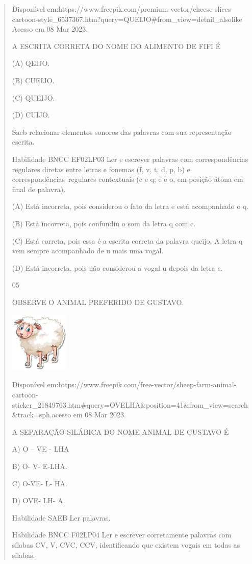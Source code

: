 {{{{\begin{verse}
{{\begin{escolha}
{{{{{Disponível
em:https://www.freepik.com/premium-vector/cheese-slices-cartoon-style\_6537367.htm?query=QUEIJO\#from\_view=detail\_alsolike
Acesso em 08 Mar 2023.

A ESCRITA CORRETA DO NOME DO ALIMENTO DE FIFI É

(A) QEIJO.

(B) CUEIJO.

(C) QUEIJO.

(D) CUIJO.

Saeb relacionar elementos sonoros das palavras com sua representação
escrita.

Habilidade BNCC EF02LP03 Ler e escrever palavras com correspondências
regulares diretas entre letras e fonemas (f, v, t, d, p, b) e
correspondências~regulares contextuais (c e q; e e o, em posição átona
em final de palavra).

(A) Está incorreta, pois considerou o fato da letra e está acompanhado o
q.

(B) Está incorreta, pois confundiu o som da letra q com c.

(C) Está correta, pois essa é a escrita correta da palavra queijo. A
letra q vem sempre acompanhado de u mais uma vogal.

(D) Está incorreta, pois não considerou a vogal u depois da letra c.

\num{05}

OBSERVE O ANIMAL PREFERIDO DE GUSTAVO.

\includegraphics[width=1.11458in,height=1.13889in]{media/image142.jpeg}

Disponível
em:https://www.freepik.com/free-vector/sheep-farm-animal-cartoon-sticker\_21849763.htm\#query=OVELHA\&position=41\&from\_view=search\&track=sph.acesso
em 08 Mar 2023.

A SEPARAÇÃO SILÁBICA DO NOME ANIMAL DE GUSTAVO É

A) O -- VE - LHA

B) O- V- E-LHA.

C) O-VE- L- HA.

D) OVE- LH- A.

Habilidade SAEB Ler palavras.

Habilidade BNCC F02LP04 Ler e escrever corretamente palavras com sílabas
CV, V, CVC, CCV, identificando que existem vogais em todas as sílabas.

}}}}}
\end{escolha}}}
\end{verse}}}}}
